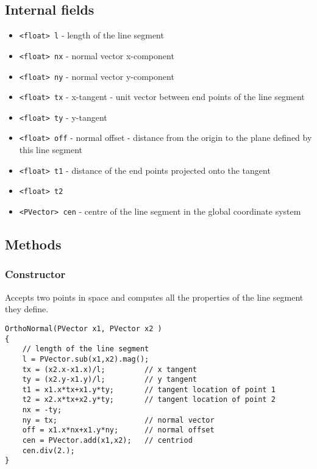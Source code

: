 \documentclass[notitlepage]{article}
\begin{document}
\subsection{Internal fields}

\begin{itemize}
\item \texttt{<float> l} - length of the line segment
\item \texttt{<float> nx} - normal vector x-component
\item \texttt{<float> ny} - normal vector y-component
\item \texttt{<float> tx} - x-tangent - unit vector between end points of the line segment
\item \texttt{<float> ty} - y-tangent
\item \texttt{<float> off} - normal offset - distance from the origin to the plane defined by this line segment
\item \texttt{<float> t1} - distance of the end points projected onto the tangent
\item \texttt{<float> t2}
\item \texttt{<PVector> cen} - centre of the line segment in the global coordinate system
\end{itemize}

\subsection{Methods}

\subsubsection{Constructor}

Accepts two points in space and computes all the properties of the line segment they define.

\begin{lstlisting}[style=myCpp]
OrthoNormal(PVector x1, PVector x2 )
{
	// length of the line segment
	l = PVector.sub(x1,x2).mag();
	tx = (x2.x-x1.x)/l;    		// x tangent
	ty = (x2.y-x1.y)/l;    		// y tangent
	t1 = x1.x*tx+x1.y*ty;  		// tangent location of point 1
	t2 = x2.x*tx+x2.y*ty;  		// tangent location of point 2
	nx = -ty;
	ny = tx;     				// normal vector
	off = x1.x*nx+x1.y*ny; 		// normal offset
	cen = PVector.add(x1,x2);	// centriod
	cen.div(2.);
}
\end{lstlisting}
\end{document}
